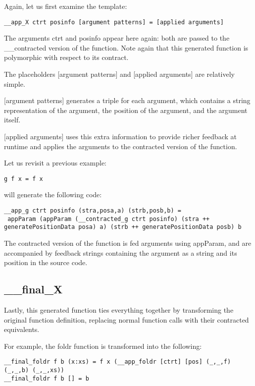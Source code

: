 \documentclass[10pt,a4paper]{article}
\begin{document}
Again, let us first examine the template:

\begin{lstlisting}
__app_X ctrt posinfo [argument patterns] = [applied arguments]
\end{lstlisting}

The arguments ctrt and posinfo appear here again: both are passed to the \_\_contracted version of the function. Note again that this generated function is polymorphic with respect to its contract.

The placeholders [argument patterns] and [applied arguments] are relatively simple.

[argument patterns] generates a triple for each argument, which contains a string representation of the argument, the position of the argument, and the argument itself.

[applied arguments] uses this extra information to provide richer feedback at runtime and applies the arguments to the contracted version of the function.

Let us revisit a previous example:

\begin{lstlisting}
g f x = f x
\end{lstlisting}

will generate the following code:
\begin{lstlisting}
__app_g ctrt posinfo (stra,posa,a) (strb,posb,b) =
 appParam (appParam (__contracted_g ctrt posinfo) (stra ++ generatePositionData posa) a) (strb ++ generatePositionData posb) b
\end{lstlisting}

The contracted version of the function is fed arguments using appParam, and are accompanied by feedback strings containing the argument as a string and its position in the source code.

\subsection{\_\_final\_X}

Lastly, this generated function ties everything together by transforming the original function definition, replacing normal function calls with their contracted equivalents.

For example, the foldr function is transformed into the following:

\begin{lstlisting}
__final_foldr f b (x:xs) = f x (__app_foldr [ctrt] [pos] (_,_,f) (_,_,b) (_,_,xs))
__final_foldr f b [] = b
\end{lstlisting}
\end{document}
